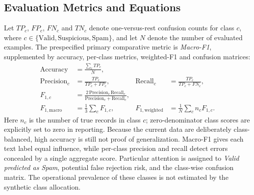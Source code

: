 \subsection{Evaluation Metrics and Equations}
Let $TP_c$, $FP_c$, $FN_c$ and $TN_c$ denote one-versus-rest confusion counts for class $c$, where $c\in\{\mathrm{Valid,Suspicious,Spam}\}$, and let $N$ denote the number of evaluated examples. The prespecified primary comparative metric is \emph{Macro-F1}, supplemented by accuracy, per-class metrics, weighted-F1 and confusion matrices:\vspace{-4pt}
\begin{align}
\mathrm{Accuracy} &= \frac{\sum_{c} TP_c}{N},\\
\mathrm{Precision}_c &= \frac{TP_c}{TP_c+FP_c},&
\mathrm{Recall}_c &= \frac{TP_c}{TP_c+FN_c},\\
F_{1,c} &= \frac{2\,\mathrm{Precision}_c\,\mathrm{Recall}_c}{\mathrm{Precision}_c+\mathrm{Recall}_c},\\
F_{1,\mathrm{macro}} &= \frac{1}{3}\sum_c F_{1,c},&
F_{1,\mathrm{weighted}} &= \frac{1}{N}\sum_c n_cF_{1,c}.
\end{align}
Here $n_c$ is the number of true records in class $c$; zero-denominator class scores are explicitly set to zero in reporting. Because the current data are deliberately class-balanced, high accuracy is still not proof of generalization. Macro-F1 gives each text label equal influence, while per-class precision and recall detect errors concealed by a single aggregate score. Particular attention is assigned to \emph{Valid predicted as Spam}, potential false rejection risk, and the class-wise confusion matrix. The operational prevalence of these classes is not estimated by the synthetic class allocation.

